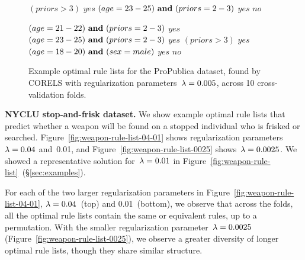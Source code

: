 \begin{figure}[h!]
\begin{algorithmic}
\State \belif $(priors > 3)$ \bthen $yes$
\State \belif $(age = 23-25) {\bf ~and~} (priors = 2-3)$ \bthen $yes$
\State \belse $no$
\end{algorithmic}
\vspace{1mm}
\begin{algorithmic}
\State \bif $(age = 21-22) {\bf ~and~} (priors = 2-3)$ \bthen $yes$ 
\State \belif $(age = 23-25) {\bf ~and~} (priors = 2-3)$ \bthen $yes$
\State \belif $(priors > 3)$ \bthen $yes$
\State \belif $(age = 18-20) {\bf ~and~} (sex = male)$ \bthen $yes$
\State \belse $no$
\end{algorithmic}
\caption{Example optimal rule lists for the ProPublica dataset,
found by CORELS with regularization parameters~${{\lambda} = 0.005}$,
across 10 cross-validation folds.
}
\label{fig:recidivism-rule-list-005}
\end{figure}

\clearpage
\textbf{NYCLU stop-and-frisk dataset.}
We show example optimal rule lists that predict whether a weapon
will be found on a stopped individual who is frisked or searched.
%
Figure~\ref{fig:weapon-rule-list-04-01} shows
regularization parameters~${{\lambda} = 0.04}$ and~0.01,
and Figure~\ref{fig:weapon-rule-list-0025} shows~${{\lambda} = 0.0025}$.
%
We showed a representative solution for~${{\lambda} = 0.01}$ in
Figure~\ref{fig:weapon-rule-list}~(\S\ref{sec:examples}).

For each of the two larger regularization parameters in Figure~\ref{fig:weapon-rule-list-04-01},
${{\lambda} = 0.04}$~(top) and 0.01~(bottom), we observe that across the folds,
all the optimal rule lists contain the same or equivalent rules, up to a permutation.
%
With the smaller regularization parameter~${{\lambda} = 0.0025}$ (Figure~\ref{fig:weapon-rule-list-0025}),
we observe a greater diversity of longer optimal rule lists, though they share similar structure.

